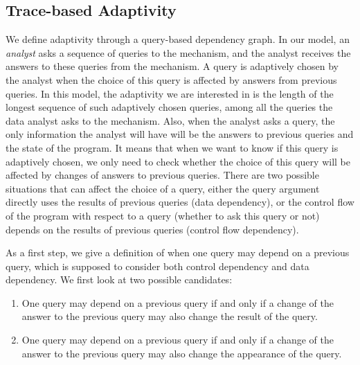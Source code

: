 \documentclass[a4paper,11pt]{article}
\begin{document}
\subsection{ Trace-based Adaptivity}
%
We define adaptivity through a query-based dependency graph. In our model, an \emph{analyst} asks a sequence of queries to the mechanism, and the analyst receives the answers to these queries from the mechanism. A query is adaptively chosen by the analyst when the choice of this query is affected by answers from previous queries. In this model, the adaptivity we are interested in is the length of the longest sequence of such adaptively chosen queries, among all the queries the data analyst asks to the mechanism.  Also, when the analyst asks a query, the only information the analyst will have will be the answers to previous queries and the state of the program. It means that when we want to know if this query is adaptively chosen, we only need to check whether the choice of this query will be affected by changes of answers to previous queries. There are two possible situations that can  affect the choice of a query,  
either the query argument directly uses the results of previous queries (data dependency), or the control flow of the program with respect to a query (whether to ask this query or not) depends on the results of previous queries (control flow dependency).

{
As a first step, we give a definition of when one query may depend on a previous query, which is supposed to consider both control dependency and data dependency. We first look at two possible candidates:
\begin{enumerate}
    \item One query may depend on a previous query if and only if a change of the answer to the previous query may also change the result of the query.
    \item One query may depend on a previous query if and only if a change of the answer to the previous query may also change the appearance of the query.
\end{enumerate}
}
\end{document}
